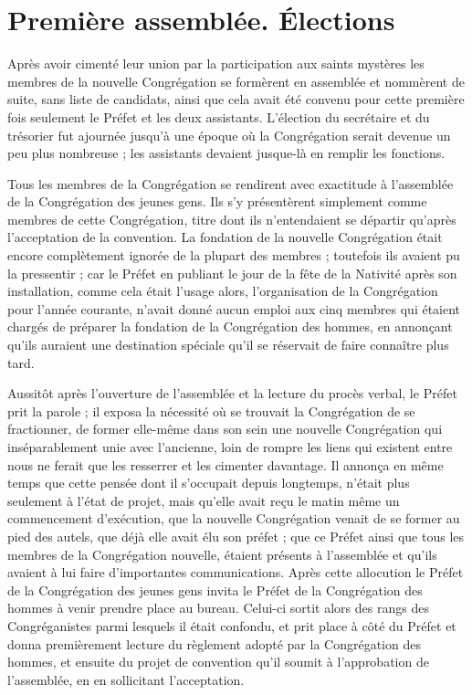 \section*{Première assemblée. Élections}
Après avoir cimenté leur union par la participation aux saints mystères les membres de la nouvelle Congrégation se formèrent en assemblée et nommèrent de suite, sans liste de candidats, ainsi que cela avait été convenu pour cette première fois seulement le Préfet et les deux assistants. L'élection du secrétaire et du trésorier fut ajournée jusqu'à une époque où la Congrégation serait
devenue un peu plus nombreuse ; les assistants devaient jusque-là en remplir les fonctions.

Tous les membres de la Congrégation se rendirent avec exactitude à l'assemblée de la Congrégation des jeunes gens. Ils s'y présentèrent simplement comme membres de cette Congrégation, titre dont ils n'entendaient se départir qu'après l'acceptation de la convention. La fondation de la nouvelle Congrégation était encore complètement ignorée de la plupart des membres ; toutefois ils avaient pu la pressentir ; car le Préfet en publiant le jour de la fête de la Nativité après son installation, comme cela était l'usage alors, l'organisation de la Congrégation pour l'année courante, n'avait donné aucun emploi aux cinq membres qui étaient chargés de préparer la fondation de la Congrégation des hommes, en annonçant qu'ils auraient une destination spéciale qu'il se réservait de faire connaître plus tard.

Aussitôt après l'ouverture de l'assemblée et la lecture du procès verbal, le Préfet prit la parole ; il exposa la nécessité où se trouvait la Congrégation de se fractionner, de former elle-même dans son sein une nouvelle Congrégation qui inséparablement unie avec l'ancienne, loin de rompre les liens qui existent entre nous ne ferait que les resserrer et les cimenter davantage. Il annonça en même temps que cette pensée dont il s'occupait depuis longtemps, n'était plus seulement à l'état de projet, mais qu'elle avait reçu le matin même un commencement d'exécution, que la nouvelle Congrégation venait de se former au pied des autels, que déjà elle avait élu son préfet ; que ce Préfet ainsi que tous les membres de la Congrégation nouvelle, étaient présents à l'assemblée et qu'ils avaient à lui
faire d'importantes communications. Après cette allocution le Préfet de la Congrégation des jeunes gens invita le Préfet de la Congrégation des hommes à venir prendre place au bureau. Celui-ci sortit alors des rangs des Congréganistes parmi lesquels il était confondu, et prit place à côté du Préfet et donna premièrement lecture du règlement adopté par la Congrégation des hommes, et ensuite du projet de convention qu'il soumit à l'approbation de l'assemblée, en en sollicitant l'acceptation.


